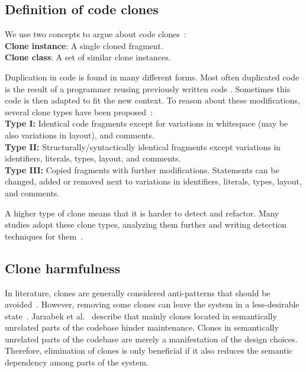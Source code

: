 \documentclass[sigconf,review,anonymous]{acmart}
\begin{document}
\subsection{Definition of code clones}
We use two concepts to argue about code clones~\cite{roy2007survey}:
\\ \textbf{Clone instance}: A single cloned fragment.
\\ \textbf{Clone class}: A set of similar clone instances.

Duplication in code is found in many different forms. Most often duplicated code is the result of a programmer reusing previously written code \cite{haefliger2008code, baxter1998clone}. Sometimes this code is then adapted to fit the new context. To reason about these modifications, several clone types have been proposed~\cite{roy2007survey}:\\
\textbf{Type I:} Identical code fragments except for variations in whitespace (may be also variations in layout), and comments.\\
\textbf{Type II:} Structurally/syntactically identical fragments except variations in identifiers, literals, types, layout, and comments.\\
\textbf{Type III:} Copied fragments with further modifications. Statements can be changed, added or removed next to variations in identifiers, literals, types, layout, and comments.

A higher type of clone means that it is harder to detect and refactor. Many studies adopt these clone types, analyzing them further and writing detection techniques for them~\cite{sajnani2016sourcerercc, kodhai2010detection, van2019novel}.

\subsection{Clone harmfulness}
In literature, clones are generally considered anti-patterns that should be avoided~\cite{fowler2018refactoring, ostberg2014automatically, chatterji2013effects}. However, removing some clones can leave the system in a less-desirable state~\cite{jarzabek2010clones, kapser2008cloning}. Jarzabek et al.~\cite{jarzabek2010clones} describe that mainly clones located in semantically unrelated parts of the codebase hinder maintenance. Clones in semantically unrelated parts of the codebase are merely a manifestation of the design choices. Therefore, elimination of clones is only beneficial if it also reduces the semantic dependency among parts of the system.
\end{document}
